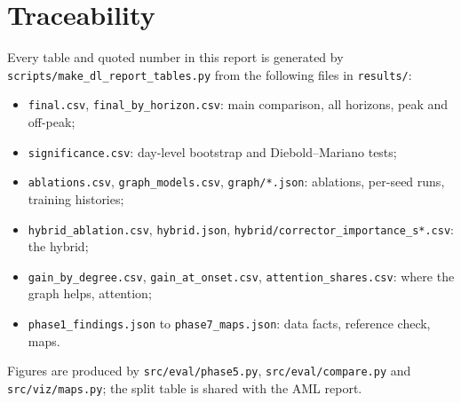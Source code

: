 \documentclass[11pt,a4paper]{article}
\begin{document}
\section{Traceability}
Every table and quoted number in this report is generated by \texttt{scripts/make\_dl\_report\_tables.py} from the
following files in \texttt{results/}:
\begin{itemize}
\item \texttt{final.csv}, \texttt{final\_by\_horizon.csv}: main comparison, all horizons, peak and off-peak;
\item \texttt{significance.csv}: day-level bootstrap and Diebold--Mariano tests;
\item \texttt{ablations.csv}, \texttt{graph\_models.csv}, \texttt{graph/*.json}: ablations, per-seed runs, training histories;
\item \texttt{hybrid\_ablation.csv}, \texttt{hybrid.json}, \texttt{hybrid/corrector\_importance\_s*.csv}: the hybrid;
\item \texttt{gain\_by\_degree.csv}, \texttt{gain\_at\_onset.csv}, \texttt{attention\_shares.csv}: where the graph helps, attention;
\item \texttt{phase1\_findings.json} to \texttt{phase7\_maps.json}: data facts, reference check, maps.
\end{itemize}
Figures are produced by \texttt{src/eval/phase5.py}, \texttt{src/eval/compare.py} and \texttt{src/viz/maps.py}; the split
table is shared with the AML report.
\end{document}
